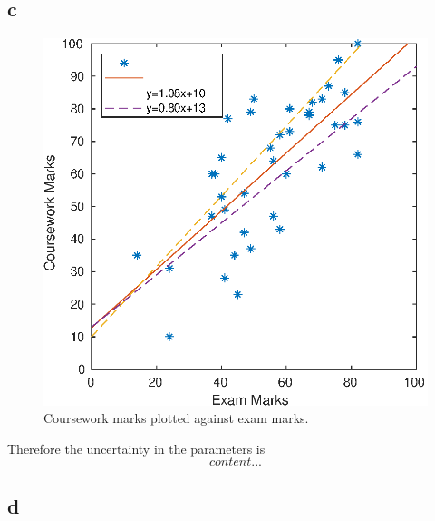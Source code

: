 \subsection*{c}
\begin{figure}[h]
	\includegraphics[scale=0.6, center]{./eps/topic1_c.eps}
	\caption{Coursework marks plotted against exam marks. }
	\label{fig:Topic1-c}
\end{figure}
Therefore the uncertainty in the parameters is
\begin{equation}
	content...
\end{equation}


\subsection*{d}